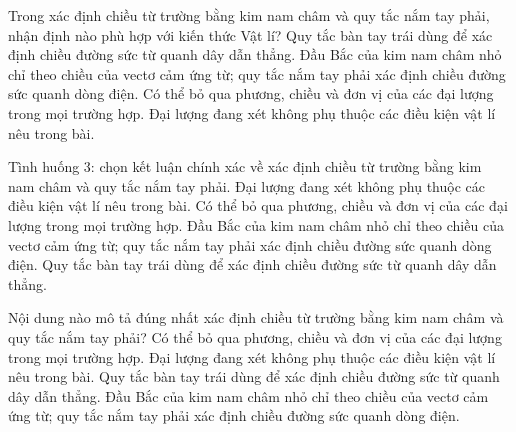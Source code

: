 \begin{ex}
Trong xác định chiều từ trường bằng kim nam châm và quy tắc nắm tay phải, nhận định nào phù hợp với kiến thức Vật lí?
\choice
{Quy tắc bàn tay trái dùng để xác định chiều đường sức từ quanh dây dẫn thẳng.}
{\True Đầu Bắc của kim nam châm nhỏ chỉ theo chiều của vectơ cảm ứng từ; quy tắc nắm tay phải xác định chiều đường sức quanh dòng điện.}
{Có thể bỏ qua phương, chiều và đơn vị của các đại lượng trong mọi trường hợp.}
{Đại lượng đang xét không phụ thuộc các điều kiện vật lí nêu trong bài.}
\end{ex}

\begin{ex}
Tình huống 3: chọn kết luận chính xác về xác định chiều từ trường bằng kim nam châm và quy tắc nắm tay phải.
\choice
{Đại lượng đang xét không phụ thuộc các điều kiện vật lí nêu trong bài.}
{Có thể bỏ qua phương, chiều và đơn vị của các đại lượng trong mọi trường hợp.}
{\True Đầu Bắc của kim nam châm nhỏ chỉ theo chiều của vectơ cảm ứng từ; quy tắc nắm tay phải xác định chiều đường sức quanh dòng điện.}
{Quy tắc bàn tay trái dùng để xác định chiều đường sức từ quanh dây dẫn thẳng.}
\end{ex}

\begin{ex}
Nội dung nào mô tả đúng nhất xác định chiều từ trường bằng kim nam châm và quy tắc nắm tay phải?
\choice
{Có thể bỏ qua phương, chiều và đơn vị của các đại lượng trong mọi trường hợp.}
{Đại lượng đang xét không phụ thuộc các điều kiện vật lí nêu trong bài.}
{Quy tắc bàn tay trái dùng để xác định chiều đường sức từ quanh dây dẫn thẳng.}
{\True Đầu Bắc của kim nam châm nhỏ chỉ theo chiều của vectơ cảm ứng từ; quy tắc nắm tay phải xác định chiều đường sức quanh dòng điện.}
\end{ex}

